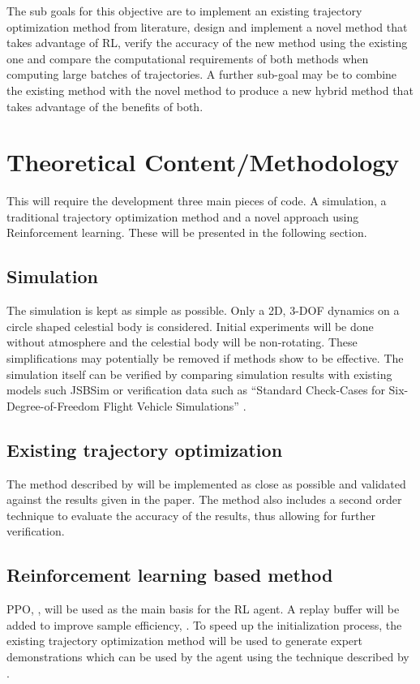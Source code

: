 \documentclass[12pt, english, NoHyper]{AE4010-template}
\begin{document}
The sub goals for this objective are to implement an existing trajectory optimization method from literature, design and implement a novel method that takes advantage of RL, verify the accuracy of the new method using the existing one and compare the computational requirements of both methods when computing large batches of trajectories. A further sub-goal may be to combine the existing method with the novel method to produce a new hybrid method that takes advantage of the benefits of both.

\section{Theoretical Content/Methodology}
This will require the development three main pieces of code. A simulation, a traditional trajectory optimization method and a novel approach using Reinforcement learning. These will be presented in the following section.


\subsection{Simulation}
The simulation is kept as simple as possible. Only a 2D, 3-DOF dynamics on a circle shaped celestial body is considered. Initial experiments will be done without atmosphere and the celestial body will be non-rotating. These simplifications may potentially be removed if methods show to be effective. The simulation itself can be verified by comparing simulation results with existing models such JSBSim or verification data such as ``Standard Check-Cases for Six-Degree-of-Freedom Flight Vehicle Simulations'' \cite{unknown}.

\subsection{Existing trajectory optimization}
The method described by \cite{pontani2014simple} will be implemented as close as possible and validated against the results given in the paper. The method also includes a second order technique to evaluate the accuracy of the results, thus allowing for further verification.

\subsection{Reinforcement learning based method}
PPO, \cite{schulman2017proximal}, will be used as the main basis for the RL agent. A replay buffer will be added to improve sample efficiency, \cite{kiran2021deep}. To speed up the initialization process, the existing trajectory optimization method will be used to generate expert demonstrations which can be used by the agent using the technique described by \cite{hester2018deep}.
\end{document}
